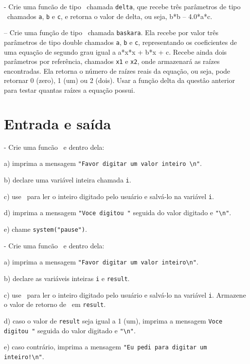 \NEWLINE
\quest - Crie uma funcão de tipo \DOUBLE\ chamada {\tt delta}, que recebe três parâmetros de tipo \DOUBLE\ chamados {\tt a}, {\tt b} e {\tt c}, e retorna o valor de delta, ou seja, b*b – 4.0*a*c.

\NEWLINE
\quest – Crie uma função de tipo \INT\ chamada {\tt baskara}. Ela recebe por valor três parâmetros de tipo double chamados {\tt a}, {\tt b} e {\tt c}, representando os coeficientes de uma equação de segundo grau igual a a*x*x + b*x + c. Recebe ainda dois parâmetros por referência, chamados {\tt x1} e {\tt x2}, onde armazenará as raízes encontradas. Ela retorna o número de raízes reais da equação, ou seja, pode retornar 0 (zero), 1 (um) ou 2 (dois). Usar a função  delta da questâo anterior para testar quantas raízes a equação possui.




\zeraquest

\section{Entrada e saída}


\NEWLINE
\quest - Crie uma funcão \MAIN\ e dentro dela:

a) imprima a mensagem \verb|"Favor digitar um valor inteiro \n"|.

b) declare uma variável inteira chamada {\tt i}.

c) use \SCANF\ para ler o inteiro digitado pelo usuário e salvá-lo na variável {\tt i}.

d) imprima a mensagem \verb|"Voce digitou "| seguida do valor digitado e \verb|"\n"|.

e) chame \verb|system("pause")|.

\NEWLINE
\quest - Crie uma funcão \MAIN\ e dentro dela:

a) imprima a mensagem \verb|"Favor digitar um valor inteiro\n"|.

b) declare as variáveis inteiras {\tt i} e {\tt result}.

c) use \SCANF\ para ler o inteiro digitado pelo usuário e salvá-lo na variável {\tt i}. Armazene o valor de retorno de \SCANF\ em {\tt result}.

d) caso o valor de {\tt result} seja igual a 1 (um), imprima a mensagem \verb|Voce digitou "| seguida do valor digitado e \verb|"\n"|.

e) caso contrário, imprima a mensagem \verb|"Eu pedi para digitar um inteiro!\n"|.

